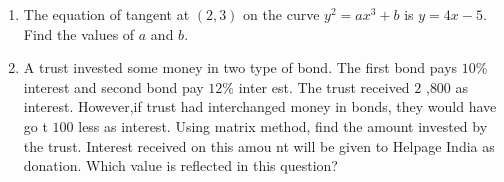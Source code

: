 \documentclass[12pt,-letter paper]{article}
\begin{document}
\begin{enumerate}
\item The equation of tangent at $(2,3)$ on the curve $y^2=ax^3+b$ is $y=4x-5$. Find the values of $a$ and $b$.            
\item A trust invested some money in two type of bond. The first bond pays $10\%$ interest and second bond pay $12\%$ inter    est. The trust received \rupee $2$ ,$800$ as interest. However,if trust had interchanged money in bonds, they would have go    t \rupee $100$ less as interest. Using matrix method, find the amount invested by the trust. Interest received on this amou    nt will be given to Helpage India as donation. Which value is reflected in this question?
\end{enumerate}
\end{document}

